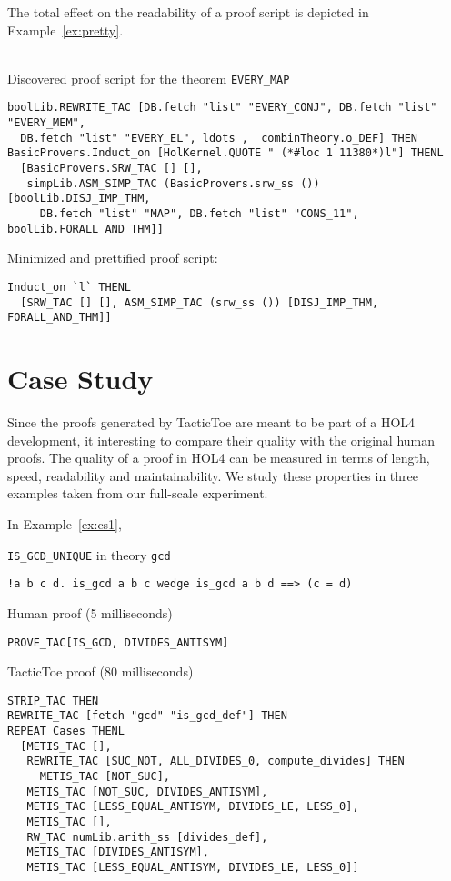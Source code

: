 \documentclass[runningheads,a4paper,draft]{svjour3}
\def\holfour{\textsf{HOL4}\xspace}
\def\tactictoe{\textsf{TacticToe}\xspace}
\begin{document}
The total effect on the readability of a proof script is depicted in
Example~\ref{ex:pretty}.
\begin{example}\label{ex:pretty}\ \\
Discovered proof script for the theorem \texttt{EVERY\_MAP}
\begin{lstlisting}[language=SMLSmall]
boolLib.REWRITE_TAC [DB.fetch "list" "EVERY_CONJ", DB.fetch "list" "EVERY_MEM",
  DB.fetch "list" "EVERY_EL", ldots ,  combinTheory.o_DEF] THEN
BasicProvers.Induct_on [HolKernel.QUOTE " (*#loc 1 11380*)l"] THENL
  [BasicProvers.SRW_TAC [] [],
   simpLib.ASM_SIMP_TAC (BasicProvers.srw_ss ()) [boolLib.DISJ_IMP_THM,
     DB.fetch "list" "MAP", DB.fetch "list" "CONS_11", boolLib.FORALL_AND_THM]]

\end{lstlisting}
Minimized and prettified proof script:
\begin{lstlisting}[language=SMLSmall]
Induct_on `l` THENL
  [SRW_TAC [] [], ASM_SIMP_TAC (srw_ss ()) [DISJ_IMP_THM, FORALL_AND_THM]]
\end{lstlisting}
\end{example}

\section{Case Study}
Since the proofs generated by \tactictoe are meant to be part of a \holfour 
development, it interesting to compare their quality with the original human 
proofs. The quality of a proof in \holfour can be measured in terms of length, 
speed, readability and maintainability. We study these properties in three 
examples taken from our full-scale experiment.

In Example~\ref{ex:cs1}, 



\begin{example}\label{ex:cs1} \texttt{IS\_GCD\_UNIQUE} in theory \texttt{gcd}
\begin{lstlisting}[language=SMLSmall]
!a b c d. is_gcd a b c wedge is_gcd a b d ==> (c = d)
\end{lstlisting}
Human proof (5 milliseconds)
\begin{lstlisting}[language=SMLSmall]
PROVE_TAC[IS_GCD, DIVIDES_ANTISYM]
\end{lstlisting}
\tactictoe proof (80 milliseconds)
\begin{lstlisting}[language=SMLSmall]
STRIP_TAC THEN
REWRITE_TAC [fetch "gcd" "is_gcd_def"] THEN
REPEAT Cases THENL
  [METIS_TAC [],
   REWRITE_TAC [SUC_NOT, ALL_DIVIDES_0, compute_divides] THEN 
     METIS_TAC [NOT_SUC],
   METIS_TAC [NOT_SUC, DIVIDES_ANTISYM],
   METIS_TAC [LESS_EQUAL_ANTISYM, DIVIDES_LE, LESS_0],
   METIS_TAC [],
   RW_TAC numLib.arith_ss [divides_def],
   METIS_TAC [DIVIDES_ANTISYM],
   METIS_TAC [LESS_EQUAL_ANTISYM, DIVIDES_LE, LESS_0]]
\end{lstlisting}
\end{example}
\end{document}
